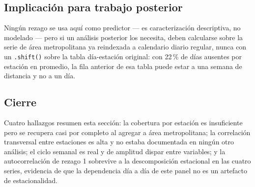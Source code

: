 \subsection{Implicación para trabajo posterior}

Ningún rezago se usa aquí como predictor --- es caracterización descriptiva,
no modelado --- pero si un análisis posterior los necesita, deben calcularse
sobre la serie de área metropolitana ya reindexada a calendario diario
regular, nunca con un \texttt{.shift()} sobre la tabla día-estación original:
con 22\,\% de días ausentes por estación en promedio, la fila anterior de esa
tabla puede estar a una semana de distancia y no a un día.

\subsection{Cierre}

Cuatro hallazgos resumen esta sección: la cobertura por estación es
insuficiente pero se recupera casi por completo al agregar a área
metropolitana; la correlación transversal entre estaciones es alta y no
estaba documentada en ningún otro análisis; el ciclo semanal es real y de
amplitud dispar entre variables; y la autocorrelación de rezago 1 sobrevive a
la descomposición estacional en las cuatro series, evidencia de que la
dependencia día a día de este panel no es un artefacto de estacionalidad.
